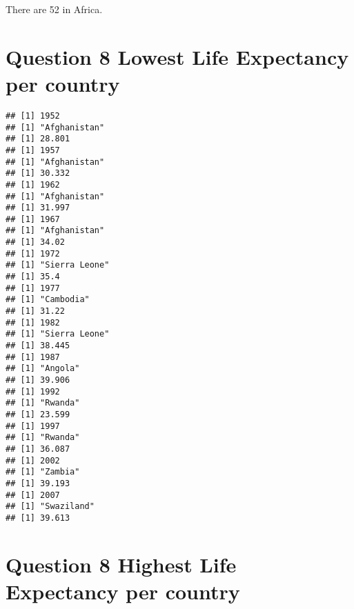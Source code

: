 \documentclass[
]{article}
\newenvironment{Shaded}{\begin{snugshade}}{\end{snugshade}}
\newcommand{\ControlFlowTok}[1]{\textcolor[rgb]{0.13,0.29,0.53}{\textbf{#1}}}
\newcommand{\DecValTok}[1]{\textcolor[rgb]{0.00,0.00,0.81}{#1}}
\newcommand{\FunctionTok}[1]{\textcolor[rgb]{0.00,0.00,0.00}{#1}}
\newcommand{\NormalTok}[1]{#1}
\newcommand{\OtherTok}[1]{\textcolor[rgb]{0.56,0.35,0.01}{#1}}
\newcommand{\SpecialCharTok}[1]{\textcolor[rgb]{0.00,0.00,0.00}{#1}}
\begin{document}
There are 52 in Africa.

\hypertarget{question-8-lowest-life-expectancy-per-country}{%
\section{Question 8 Lowest Life Expectancy per
country}\label{question-8-lowest-life-expectancy-per-country}}

\begin{Shaded}
\end{Shaded}

\begin{verbatim}
## [1] 1952
## [1] "Afghanistan"
## [1] 28.801
## [1] 1957
## [1] "Afghanistan"
## [1] 30.332
## [1] 1962
## [1] "Afghanistan"
## [1] 31.997
## [1] 1967
## [1] "Afghanistan"
## [1] 34.02
## [1] 1972
## [1] "Sierra Leone"
## [1] 35.4
## [1] 1977
## [1] "Cambodia"
## [1] 31.22
## [1] 1982
## [1] "Sierra Leone"
## [1] 38.445
## [1] 1987
## [1] "Angola"
## [1] 39.906
## [1] 1992
## [1] "Rwanda"
## [1] 23.599
## [1] 1997
## [1] "Rwanda"
## [1] 36.087
## [1] 2002
## [1] "Zambia"
## [1] 39.193
## [1] 2007
## [1] "Swaziland"
## [1] 39.613
\end{verbatim}

\hypertarget{question-8-highest-life-expectancy-per-country}{%
\section{Question 8 Highest Life Expectancy per
country}\label{question-8-highest-life-expectancy-per-country}}
\end{document}
